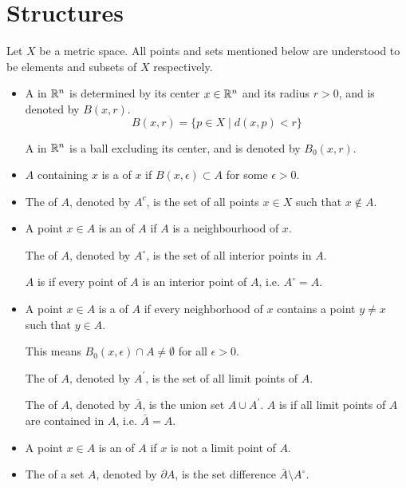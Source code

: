 \section{Structures}
Let $X$ be a metric space. All points and sets mentioned below are understood to be elements and subsets of $X$ respectively.
\begin{itemize}
\item A  in $\mathbb R^n$ is determined by its center $x\in\mathbb R^n$ and its radius $r>0$, and is denoted by $B(x,r)$.
\[ B(x,r) = \{p \in X \mid d(x,p) < r\} \]

A  in $\mathbb R^n$ is a ball excluding its center, and is denoted by $B_0(x,r)$.

\item $A$ containing $x$ is a  of $x$ if $B(x,\epsilon) \subset A$ for some $\epsilon>0$.

\item The  of $A$, denoted by $A^c$, is the set of all points $x \in X$ such that $x \notin A$.

\item A point $x \in A$ is an  of $A$ if $A$ is a neighbourhood of $x$.

The  of $A$, denoted by $A^\circ$, is the set of all interior points in $A$.

$A$ is  if every point of $A$ is an interior point of $A$, i.e. $A^\circ=A$.

\item A point $x\in A$ is a  of $A$ if every neighborhood of $x$ contains a point $y \neq x$ such that $y \in A$.

This means $B_0(x,\epsilon) \cap A \neq \emptyset$ for all $\epsilon>0$.

The  of $A$, denoted by $A^\prime$, is the set of all limit points of $A$.

The  of $A$, denoted by $\bar{A}$, is the union set $A\cup A^\prime$. $A$ is  if all limit points of $A$ are contained in $A$, i.e. $\bar{A}=A$.

\item A point $x \in A$ is an  of $A$ if $x$ is not a limit point of $A$.

\item The  of a set $A$, denoted by $\partial A$, is the set difference $\bar{A}\setminus A^\circ$.


\end{itemize}
